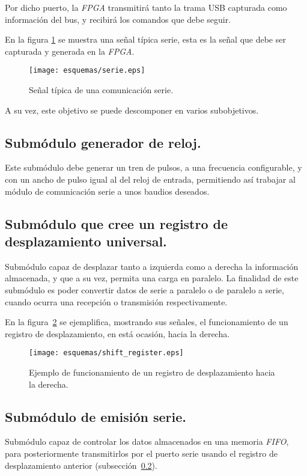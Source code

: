 Por dicho puerto, la \emph{FPGA} transmitirá tanto la trama USB capturada como información del bus, y recibirá los comandos que debe seguir.

En la figura \ref{fig:serie_esquema} se muestra una señal típica serie, esta es la señal que debe ser capturada y generada en la \emph{FPGA}.

\begin{figure}[htb]
    \centering
    \texttt{[image: esquemas/serie.eps]}
    \caption{Señal típica de una comunicación serie.}
    \label{fig:serie_esquema}
\end{figure}

A su vez, este objetivo se puede descomponer en varios subobjetivos.
\subsection{Submódulo generador de reloj.}
Este submódulo debe generar un tren de pulsos, a una frecuencia configurable, y con un ancho de pulso igual al del reloj de entrada, permitiendo así trabajar al módulo de comunicación serie a unos baudios deseados.

\subsection{Submódulo que cree un registro de desplazamiento universal.}
\label{ssct:registro_desplazamiento}
Submódulo capaz de desplazar tanto a izquierda como a derecha la información almacenada, y que a su vez, permita una carga en paralelo.
La finalidad de este submódulo es poder convertir datos de serie a paralelo o de paralelo a serie, cuando ocurra una recepción o transmisión respectivamente.

En la figura~\ref{fig:shift_ejemplo} se ejemplifica, mostrando sus señales, el funcionamiento de un registro de desplazamiento, en está ocasión, hacia la derecha.

\begin{figure}[htb]
    \centering
    \texttt{[image: esquemas/shift\_register.eps]}
    \caption{Ejemplo de funcionamiento de un registro de desplazamiento hacia la derecha.}
    \label{fig:shift_ejemplo}
\end{figure}

\subsection{Submódulo de emisión serie.}
Submódulo capaz de controlar los datos almacenados en una memoria \emph{FIFO}, para posteriormente transmitirlos por el puerto serie usando el registro de desplazamiento anterior (subsección~\ref{ssct:registro_desplazamiento}).

